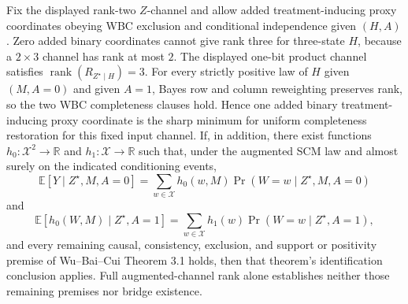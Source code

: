 Fix the displayed rank-two \(Z\)-channel and allow added treatment-inducing proxy coordinates obeying WBC exclusion and conditional independence given \((H,A)\). Zero added binary coordinates cannot give rank three for three-state \(H\), because a \(2\times3\) channel has rank at most \(2\). The displayed one-bit product channel satisfies \(\operatorname{rank}(R_{Z^{\star}\mid H})=3\). For every strictly positive law of \(H\) given \((M,A=0)\) and given \(A=1\), Bayes row and column reweighting preserves rank, so the two WBC completeness clauses hold. Hence one added binary treatment-inducing proxy coordinate is the sharp minimum for uniform completeness restoration for this fixed input channel. If, in addition, there exist functions \(h_0:\mathcal X^2\to\mathbb R\) and \(h_1:\mathcal X\to\mathbb R\) such that, under the augmented SCM law and almost surely on the indicated conditioning events,
\[
 \mathbb E[Y\mid Z^{\star},M,A=0]
 =\sum_{w\in\mathcal X}h_0(w,M)\Pr(W=w\mid Z^{\star},M,A=0)
\]
and
\[
 \mathbb E[h_0(W,M)\mid Z^{\star},A=1]
 =\sum_{w\in\mathcal X}h_1(w)\Pr(W=w\mid Z^{\star},A=1),
\]
and every remaining causal, consistency, exclusion, and support or positivity premise of Wu--Bai--Cui Theorem 3.1 holds, then that theorem's identification conclusion applies. Full augmented-channel rank alone establishes neither those remaining premises nor bridge existence.